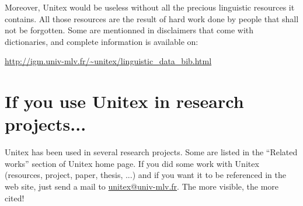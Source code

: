 \bigskip
\noindent Moreover, Unitex would be useless without all the precious linguistic
resources it contains. All those resources are the result of hard work done
by people that shall not be forgotten. Some are mentionned in disclaimers that
come with dictionaries, and complete information is available on:

\bigskip
\noindent \url{http://igm.univ-mlv.fr/~unitex/linguistic_data_bib.html}


\section*{If you use Unitex in research projects...}
Unitex has been used in several research projects. Some are listed in the
``Related works'' section of Unitex home page. If you did some work with Unitex
(resources, project, paper, thesis, ...) and if you want it to be referenced in
the web site, just send a mail to \url{unitex@univ-mlv.fr}. The more visible,
the more cited!
